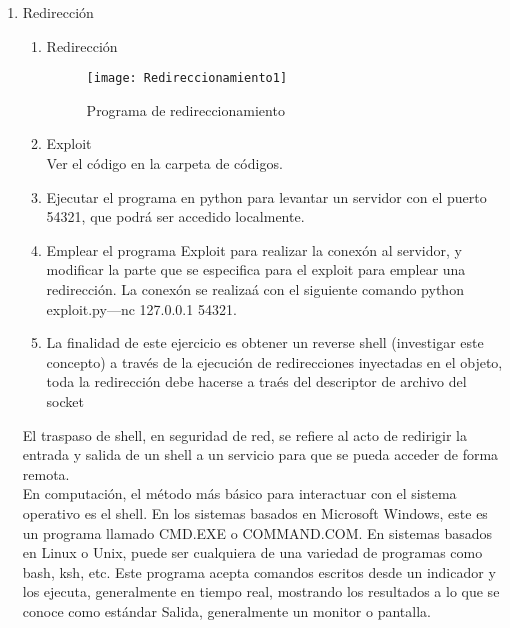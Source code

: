 \documentclass[a4paperx]{article}
\begin{document}
\begin{enumerate}

\item{Redirecci\'on}\\

\begin{enumerate}

\item{Redirecci\'on}\\

\begin{figure}[H]
\centering
\texttt{[image: Redireccionamiento1]}
\caption{Programa de redireccionamiento}
\end{figure}

\item{Exploit}\\

Ver el c\'odigo en la carpeta de c\'odigos.

\item{Ejecutar el programa en python para levantar un servidor con el puerto 54321, que podr\'a ser accedido localmente.}\\

\item{Emplear el programa Exploit para realizar la conex\'on al servidor, y modificar la parte que se especifica para el exploit para emplear una  redirecci\'on.  La  conex\'on  se  realiza\'a  con  el  siguiente  comando python exploit.py—nc 127.0.0.1 54321.
}\\

\item{La finalidad de este ejercicio es obtener un reverse shell (investigar este concepto) a trav\'es de la ejecuci\'on de redirecciones inyectadas en el objeto, toda la redirecci\'on debe hacerse a tra\'es del descriptor de archivo del socket}\\

\end{enumerate}

El traspaso de shell, en seguridad de red, se refiere al acto de redirigir la entrada y salida de un shell a un servicio para que se pueda acceder de forma remota.\\

En computaci\'on, el m\'etodo m\'as b\'asico para interactuar con el sistema operativo es el shell. En los sistemas basados ​​en Microsoft Windows, este es un programa llamado CMD.EXE o COMMAND.COM. En sistemas basados ​​en Linux o Unix, puede ser cualquiera de una variedad de programas como bash, ksh, etc. Este programa acepta comandos escritos desde un indicador y los ejecuta, generalmente en tiempo real, mostrando los resultados a lo que se conoce como est\'andar Salida, generalmente un monitor o pantalla.\\


\end{enumerate}
\end{document}
